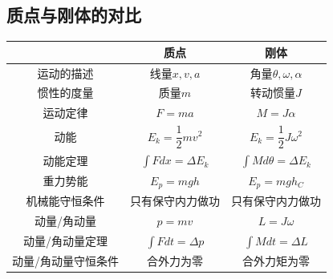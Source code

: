 \subsection{质点与刚体的对比}

\vspace{1em}

\begin{table}[htb]
    \centering
    \begin{tabular}{|c|c|c|}
        \hline
         & 质点 & 刚体 \\
        \hline
        运动的描述 & 线量$x,v,a$ & 角量$\theta, \omega, \alpha$ \\
        \hline
        惯性的度量 & 质量$m$ & 转动惯量$J$ \\
        \hline
        运动定律 & $F=ma$ & $M=J\alpha$ \\
        \hline
        \rule{0pt}{18pt}\rule[-12pt]{0pt}{0pt} 动能 & $E_k=\dfrac{1}{2}mv^2$ & $E_k=\dfrac{1}{2}J\omega^2$ \\
        \hline
        \rule{0pt}{18pt}\rule[-12pt]{0pt}{0pt} 动能定理 & $\displaystyle\int{Fdx}=\Delta E_k$ & $\displaystyle\int{Md\theta}=\Delta E_k$ \\
        \hline
        重力势能 & $E_p=mgh$ & $E_p=mgh_C$ \\
        \hline
        机械能守恒条件 & 只有保守内力做功 & 只有保守内力做功 \\
        \hline
        动量/角动量 & $p=mv$ & $L=J\omega$ \\
        \hline
        \rule{0pt}{18pt}\rule[-12pt]{0pt}{0pt} 动量/角动量定理 & $\displaystyle\int{Fdt}=\Delta p$ & $\displaystyle\int{Mdt}=\Delta L$ \\
        \hline
        动量/角动量守恒条件 & 合外力为零 & 合外力矩为零 \\
        \hline
    \end{tabular}
\end{table}